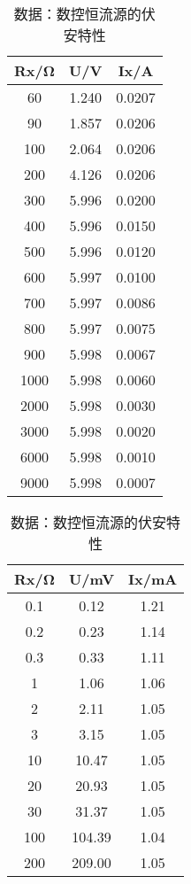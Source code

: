 \documentclass[dvipsnames, svgnames,a4paper,11pt]{article}
\begin{document}
\begin{enumerate}
		\begin{table}[htbp]
			\centering
			\begin{minipage}{.5\linewidth}
			  \centering
			  \caption{数据：直流稳压电源的伏安特性}
				\begin{tabular}{|c|c|c|}
					\hline
					Rx/Ω & U/V & Ix/A \\
					\hline
					60 & 1.240 & 0.0207 \\
					90 & 1.857 & 0.0206 \\
					100 & 2.064 & 0.0206 \\
					200 & 4.126 & 0.0206 \\
					300 & 5.996 & 0.0200 \\
					400 & 5.996 & 0.0150 \\
					500 & 5.996 & 0.0120 \\
					600 & 5.997 & 0.0100 \\
					700 & 5.997 & 0.0086 \\
					800 & 5.997 & 0.0075 \\
					900 & 5.998 & 0.0067 \\
					1000 & 5.998 & 0.0060 \\
					2000 & 5.998 & 0.0030 \\
					3000 & 5.998 & 0.0020 \\
					6000 & 5.998 & 0.0010 \\
					9000 & 5.998 & 0.0007 \\
					\hline
				\end{tabular}
			  \label{tab:tab4}
			\end{minipage}%
			\begin{minipage}{.5\linewidth}
			  \centering
			  \caption{数据：数控恒流源的伏安特性}
			  \begin{tabular}{|c|c|c|}
				\hline
				Rx/Ω & U/mV & Ix/mA \\
				\hline
				0.1 & 0.12 & 1.21 \\
				0.2 & 0.23 & 1.14 \\
				0.3 & 0.33 & 1.11 \\
				1 & 1.06 & 1.06 \\
				2 & 2.11 & 1.05 \\
				3 & 3.15 & 1.05 \\
				10 & 10.47 & 1.05 \\
				20 & 20.93 & 1.05 \\
				30 & 31.37 & 1.05 \\
				100 & 104.39 & 1.04 \\
				200 & 209.00 & 1.05 \\

\end{tabular}
\end{minipage}
\end{table}
\end{enumerate}
\end{document}
